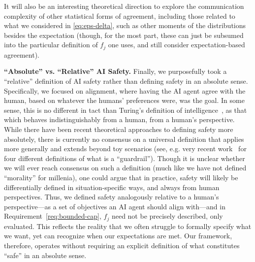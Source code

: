 It will also be an interesting theoretical direction to explore the communication complexity of other statistical forms of agreement, including those related to what we considered in \eqref{eq:eps-delta}, such as other moments of the distributions besides the expectation (though, for the most part, these can just be subsumed into the particular definition of $f_j$ one uses, and still consider expectation-based agreement).

\textbf{``Absolute'' vs. ``Relative'' AI Safety.} Finally, we purposefully took a ``relative'' definition of AI safety rather than defining safety in an absolute sense.
Specifically, we focused on alignment, where having the AI agent agree with the human, based on whatever the humans' preferences were, was the goal.
In some sense, this is no different in tact than Turing's definition of intelligence~\citep{turing1950computing}, as that which behaves indistinguishably from a human, from a human's perspective.
While there have been recent theoretical approaches to defining safety more absolutely, there is currently no consensus on a universal definition that applies more generally and extends beyond toy scenarios (see, e.g. very recent work~\citep[pg. 10]{bengio2024can} for four different definitions of what is a ``guardrail'').
Though it is unclear whether we will ever reach consensus on such a definition (much like we have not defined ``morality'' for millenia), one could argue that in practice, safety will likely be differentially defined in situation-specific ways, and always from human perspectives.
Thus, we defined safety analogously relative to a human's perspective---as a set of objectives an AI agent should align with---and in Requirement~\ref{req:bounded-cap}, 
$f_j$ need not be precisely described, only evaluated. 
This reflects the reality that we often struggle to formally specify what we want, yet can recognize when our expectations are met.
Our framework, therefore, operates without requiring an explicit definition of what constitutes ``safe'' in an absolute sense.

